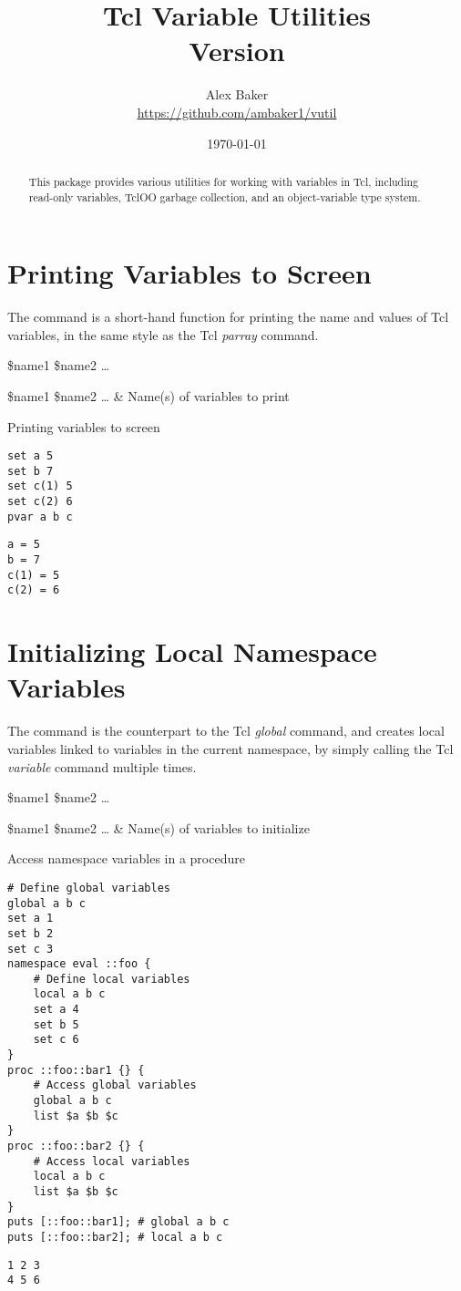 \documentclass{article}
\title{\Huge Tcl Variable Utilities\\\small Version \version}
\author{Alex Baker\\\small\url{https://github.com/ambaker1/vutil}}
\date{\small\today}
\begin{document}
\maketitle
\begin{abstract}
\begin{center}
This package provides various utilities for working with variables in Tcl, including read-only variables, TclOO garbage collection, and an object-variable type system.
\end{center}
\end{abstract}
\clearpage
\section{Printing Variables to Screen} 
The  command is a short-hand function for printing the name and values of Tcl variables, in the same style as the Tcl \textit{parray} command.
\begin{syntax}
 \$name1 \$name2 …
\end{syntax}
\begin{args}
\$name1 \$name2 … & Name(s) of variables to print
\end{args}

\begin{example}{Printing variables to screen}
\begin{lstlisting}
set a 5
set b 7
set c(1) 5
set c(2) 6
pvar a b c
\end{lstlisting}
\tcblower
\begin{lstlisting}
a = 5
b = 7
c(1) = 5
c(2) = 6
\end{lstlisting}
\end{example}
\clearpage
\section{Initializing Local Namespace Variables}
The command  is the counterpart to the Tcl \textit{global} command, and creates local variables linked to variables in the current namespace, by simply calling the Tcl \textit{variable} command multiple times.
\begin{syntax}
 \$name1 \$name2 …
\end{syntax}
\begin{args}
\$name1 \$name2 … & Name(s) of variables to initialize
\end{args}
\begin{example}{Access namespace variables in a procedure}
\begin{lstlisting}
# Define global variables
global a b c
set a 1
set b 2
set c 3
namespace eval ::foo {
    # Define local variables
    local a b c
    set a 4
    set b 5
    set c 6
}
proc ::foo::bar1 {} {
    # Access global variables
    global a b c
    list $a $b $c
}
proc ::foo::bar2 {} {
    # Access local variables
    local a b c
    list $a $b $c
}
puts [::foo::bar1]; # global a b c
puts [::foo::bar2]; # local a b c
\end{lstlisting}
\tcblower
\begin{lstlisting}
1 2 3
4 5 6
\end{lstlisting}
\end{example}
\end{document}
